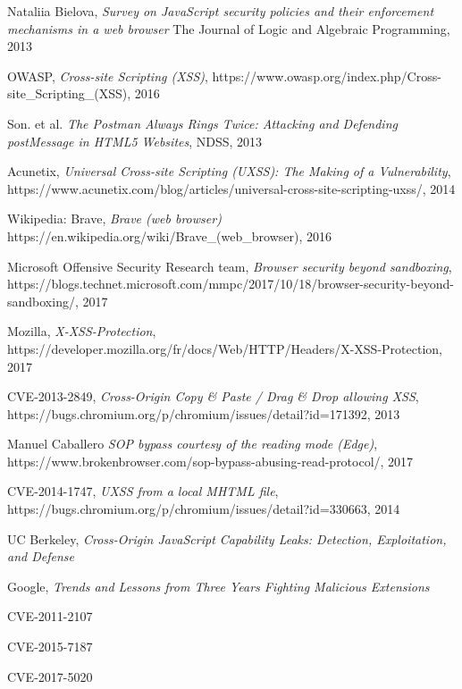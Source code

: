 \documentclass[journal]{IEEEtran}
\begin{document}
\begin{thebibliography}{1}
Nataliia Bielova,
\textit{Survey on JavaScript security policies and their enforcement mechanisms in a web browser}
The Journal of Logic and Algebraic Programming, 2013

OWASP,
\textit{Cross-site Scripting (XSS)},
https://www.owasp.org/index.php/Cross-site\_Scripting\_(XSS),
2016

Son. et al.
\textit{The Postman Always Rings Twice: Attacking and Defending postMessage in HTML5 Websites},
NDSS, 2013

Acunetix,
\textit{Universal Cross-site Scripting (UXSS): The Making of a Vulnerability},
https://www.acunetix.com/blog/articles/universal-cross-site-scripting-uxss/,
2014

Wikipedia: Brave,
\textit{Brave (web browser)}
https://en.wikipedia.org/wiki/Brave\_(web\_browser),
2016

Microsoft Offensive Security Research team,
\textit{Browser security beyond sandboxing},
https://blogs.technet.microsoft.com/mmpc/2017/10/18/browser-security-beyond-sandboxing/,
2017

Mozilla,
\textit{X-XSS-Protection},
https://developer.mozilla.org/fr/docs/Web/HTTP/Headers/X-XSS-Protection,
2017

CVE-2013-2849,
\textit{Cross-Origin Copy \& Paste / Drag \& Drop allowing XSS},
https://bugs.chromium.org/p/chromium/issues/detail?id=171392,
2013

Manuel Caballero
\textit{SOP bypass courtesy of the reading mode (Edge)},
https://www.brokenbrowser.com/sop-bypass-abusing-read-protocol/,
2017

CVE-2014-1747,
\textit{UXSS from a local MHTML file},
https://bugs.chromium.org/p/chromium/issues/detail?id=330663,
2014

UC Berkeley,
\textit{Cross-Origin JavaScript Capability Leaks: Detection, Exploitation, and Defense}


Google,
\textit{Trends and Lessons from Three Years Fighting Malicious Extensions}

CVE-2011-2107

CVE-2015-7187

CVE-2017-5020


\end{thebibliography}
\end{document}
